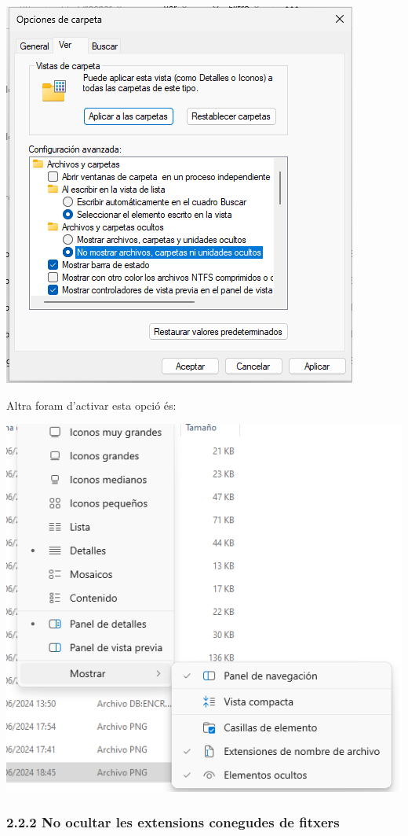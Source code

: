 \documentclass[
  a4paper,
]{article}
\begin{document}
\includegraphics{png/veropcionesCarpeta2.png}

Altra foram d'activar esta opció és:

\includegraphics{png/verOcultos.png}

\subsubsection{2.2.2 No ocultar les extensions conegudes de
fitxers}\label{no-ocultar-les-extensions-conegudes-de-fitxers}
\end{document}
